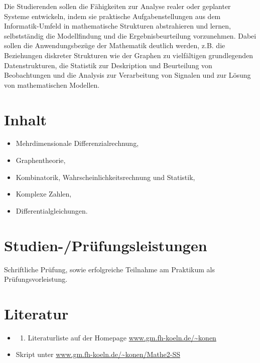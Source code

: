 Die Studierenden sollen die Fähigkeiten zur Analyse realer oder
geplanter Systeme entwickeln, indem sie praktische Aufgabenstellungen
aus dem Informatik-Umfeld in mathematische Strukturen abstrahieren und
lernen, selbstständig die Modellfindung und die Ergebnisbeurteilung
vorzunehmen. Dabei sollen die Anwendungsbezüge der Mathematik deutlich
werden, z.B. die Beziehungen diskreter Strukturen wie der Graphen zu
vielfältigen grundlegenden Datenstrukturen, die Statistik zur
Deskription und Beurteilung von Beobachtungen und die Analysis zur
Verarbeitung von Signalen und zur Lösung von mathematischen Modellen.

\section*{Inhalt\label{/mi-2017/modulbeschreibungen-bachelor/BA_Mathematik2}}\label{inhaltpathlabelmi-2017modulbeschreibungen-bachelorbaux5fmathematik2}

\begin{itemize}
\tightlist
\item
  Mehrdimensionale Differenzialrechnung,
\item
  Graphentheorie,
\item
  Kombinatorik, Wahrscheinlichkeitsrechnung und Statistik,
\item
  Komplexe Zahlen,
\item
  Differentialgleichungen.
\end{itemize}

\section*{Studien-/Prüfungsleistungen\label{/mi-2017/modulbeschreibungen-bachelor/BA_Mathematik2}}\label{studien-pruxfcfungsleistungenpathlabelmi-2017modulbeschreibungen-bachelorbaux5fmathematik2}

Schriftliche Prüfung, sowie erfolgreiche Teilnahme am Praktikum als
Prüfungsvorleistung.

\section*{Literatur\label{/mi-2017/modulbeschreibungen-bachelor/BA_Mathematik2}}\label{literaturpathlabelmi-2017modulbeschreibungen-bachelorbaux5fmathematik2}

\begin{itemize}
\tightlist
\item
  \begin{enumerate}
  \def\labelenumi{\alph{enumi}.}
  \setcounter{enumi}{18}
  \tightlist
  \item
    Literaturliste auf der Homepage
    \href{http://www.gm.fh-koeln.de/~konen}{www.gm.fh-koeln.de/\textasciitilde{}konen}
  \end{enumerate}
\item
  Skript unter
  \href{http://www.gm.fh-koeln.de/~konen/Mathe2-SS}{www.gm.fh-koeln.de/\textasciitilde{}konen/Mathe2-SS}
\end{itemize}

